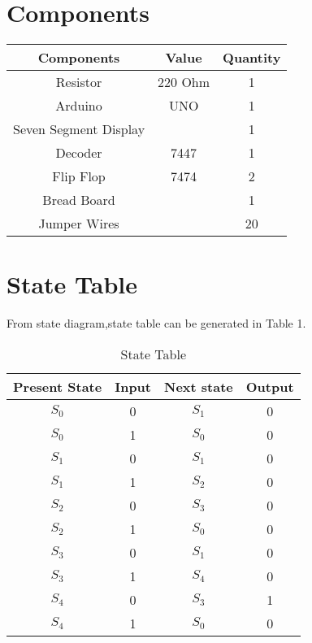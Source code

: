 \documentclass{article}
\begin{document}
	\section{Components}	
\begin{table}[h]
\centering

\begin{tabular}{|c|c|c|}
\hline
Components & Value & Quantity\\
\hline
Resistor & 220 Ohm & 1\\
\hline
Arduino & UNO & 1\\
\hline
Seven Segment Display & & 1\\
\hline
Decoder & 7447 & 1\\
\hline
Flip Flop & 7474 & 2\\
\hline
Bread Board & & 1\\
\hline
Jumper Wires & & 20\\
\hline
\end{tabular}

\vspace{2mm}
\label{table:1}
\end{table}
\vspace{5mm}
\section{State Table}
  From state diagram,state table can be generated in Table 1.
  
  \vspace{5mm}
  \begin{table}[h]
  \centering
  \begin{tabular}{|c|c|c|c|}
  \hline
   
   \textbf{Present State}&{Input}&{Next state}&{Output}\\
   \hline
   
	 \textbf{$S_0$}&{0}&{$S_1$}&{0}\\
         \textbf{$S_0$}&{1}&{$S_0$}&{0}\\
         \textbf{$S_1$}&{0}&{$S_1$}&{0}\\
         \textbf{$S_1$}&{1}&{$S_2$}&{0}\\
         \textbf{$S_2$}&{0}&{$S_3$}&{0}\\
         \textbf{$S_2$}&{1}&{$S_0$}&{0}\\
         \textbf{$S_3$}&{0}&{$S_1$}&{0}\\
         \textbf{$S_3$}&{1}&{$S_4$}&{0}\\
         \textbf{$S_4$}&{0}&{$S_3$}&{1}\\
         \textbf{$S_4$}&{1}&{$S_0$}&{0}\\
  \hline
  \end{tabular}
  \vspace{5mm}
  \caption{State Table}  
  \end{table}
\end{document}

